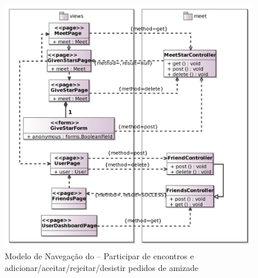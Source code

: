 \begin{figure}[H]
	\centering
	\includegraphics[scale=0.15]{figuras/FrameWebNavigationModel5.jpg}
	\caption{Modelo de Navegação do \imprimirtitulo{} -- Participar de encontros e adicionar/aceitar/rejeitar/desistir pedidos de amizade}
	\label{fig:nav5}
\end{figure}

